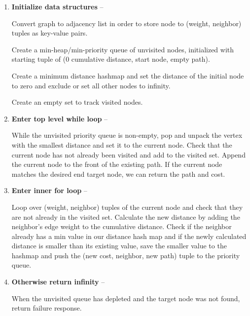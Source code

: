 \documentclass{article}
\begin{document}
    \begin{enumerate}
        \item \textbf{Initialize data structures} -- 
        
        Convert graph to adjacency list in order to store node to (weight, neighbor) tuples as key-value pairs.
         
        Create a min-heap/min-priority queue of unvisited nodes, initialized with starting tuple of (0 cumulative distance, start node, empty path). 
        
        Create a minimum distance hashmap and set the distance of the initial node to zero and exclude or set all other nodes to infinity. 
        
        Create an empty set to track visited nodes. 
        
        \item \textbf{Enter top level while loop} -- 
        
        While the unvisited priority queue is non-empty, pop and unpack the vertex with the smallest distance and set it to the current node. Check that the current node has not already been visited and add to the visited set. Append the current node to the front of the existing path. If the current node matches the desired end target node, we can return the path and cost.
        
        \item \textbf{Enter inner for loop} -- 
        
        Loop over (weight, neighbor) tuples of the current node and check that they are not already in the visited set. Calculate the new distance by adding the neighbor's edge weight to the cumulative distance. Check if the neighbor already has a min value in our distance hash map and if the newly calculated distance is smaller than its existing value, save the smaller value to the hashmap and push the (new cost, neighbor, new path) tuple to the priority queue. 
        
        \item \textbf{Otherwise return infinity} -- 
        
        When the unvisited queue has depleted and the target node was not found, return failure response.
    \end{enumerate}
    
\end{document}
